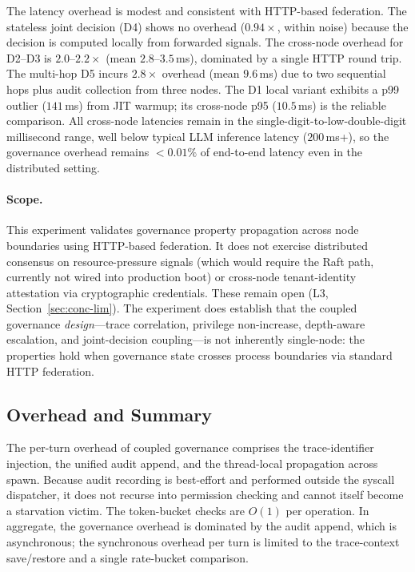 The latency overhead is modest and consistent with HTTP-based
federation. The stateless joint decision (D4) shows no overhead
($0.94\times$, within noise) because the decision is computed locally
from forwarded signals. The cross-node overhead for D2--D3 is
$2.0$--$2.2\times$ (mean $2.8$--$3.5$\,ms), dominated by a single
HTTP round trip. The multi-hop D5 incurs $2.8\times$ overhead
(mean $9.6$\,ms) due to two sequential hops plus audit collection
from three nodes. The D1 local variant exhibits a p99 outlier
($141$\,ms) from JIT warmup; its cross-node p95 ($10.5$\,ms) is
the reliable comparison. All cross-node latencies remain in the
single-digit-to-low-double-digit millisecond range, well below
typical LLM inference latency ($200$\,ms+), so the governance
overhead remains $<0.01\%$ of end-to-end latency even in the
distributed setting.

\paragraph{Scope.}
This experiment validates governance property propagation across
node boundaries using HTTP-based federation. It does not exercise
distributed consensus on resource-pressure signals (which would
require the Raft path, currently not wired into production boot)
or cross-node tenant-identity attestation via cryptographic
credentials. These remain open (L3, Section~\ref{sec:conc-lim}).
The experiment does establish that the coupled governance
\emph{design}---trace correlation, privilege non-increase,
depth-aware escalation, and joint-decision coupling---is not
inherently single-node: the properties hold when governance state
crosses process boundaries via standard HTTP federation.

\subsection{Overhead and Summary}
\label{sec:eval-overhead}

The per-turn overhead of coupled governance comprises the trace-identifier
injection, the unified audit append, and the thread-local propagation across
spawn. Because audit recording is best-effort and performed outside the
syscall dispatcher, it does not recurse into permission checking and cannot
itself become a starvation victim. The token-bucket checks are $O(1)$ per
\IO{} operation. In aggregate, the governance overhead is dominated by the
audit append, which is asynchronous; the synchronous overhead per turn is
limited to the trace-context save/restore and a single rate-bucket
comparison.

